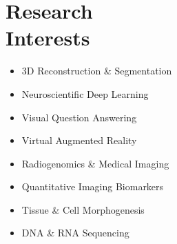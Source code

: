 \section{\sc Research \\ Interests}
\vspace{0.09cm}
	\begin{minipage}{0.55\linewidth}
		\begin{itemize}
			\item 3D Reconstruction \& Segmentation
			\item Neuroscientific Deep Learning
			\item Visual Question Answering
			\item Virtual Augmented Reality
		\end{itemize}

	\end{minipage}
	\begin{minipage}{0.55\linewidth}	
		\begin{itemize}
	\item Radiogenomics \& Medical Imaging
	\item Quantitative Imaging Biomarkers
	\item Tissue \& Cell Morphogenesis
	\item DNA \& RNA Sequencing

\end{itemize}
	\end{minipage}

\endinput
